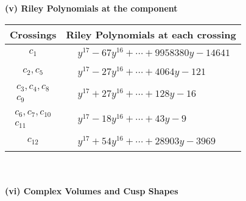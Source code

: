 \documentclass[1p]{elsarticle_modified}
\theoremstyle{definition}
\begin{document}
\flushleft \textbf{(v) Riley Polynomials at the component}\newline \\
\begin{tabular}{m{50pt}|m{274pt}}
Crossings & \hspace{64pt}Riley Polynomials at each crossing \\
\hline $$\begin{aligned}c_{1}\end{aligned}$$&$\begin{aligned}
&y^{17}-67 y^{16}+\cdots+9958380 y-14641
\end{aligned}$\\
\hline $$\begin{aligned}c_{2},c_{5}\end{aligned}$$&$\begin{aligned}
&y^{17}-27 y^{16}+\cdots+4064 y-121
\end{aligned}$\\
\hline $$\begin{aligned}c_{3},c_{4},c_{8}\\c_{9}\end{aligned}$$&$\begin{aligned}
&y^{17}+27 y^{16}+\cdots+128 y-16
\end{aligned}$\\
\hline $$\begin{aligned}c_{6},c_{7},c_{10}\\c_{11}\end{aligned}$$&$\begin{aligned}
&y^{17}-18 y^{16}+\cdots+43 y-9
\end{aligned}$\\
\hline $$\begin{aligned}c_{12}\end{aligned}$$&$\begin{aligned}
&y^{17}+54 y^{16}+\cdots+28903 y-3969
\end{aligned}$\\
\hline
\end{tabular}\\~\\
\newpage\flushleft \textbf{(vi) Complex Volumes and Cusp Shapes}
\end{document}
